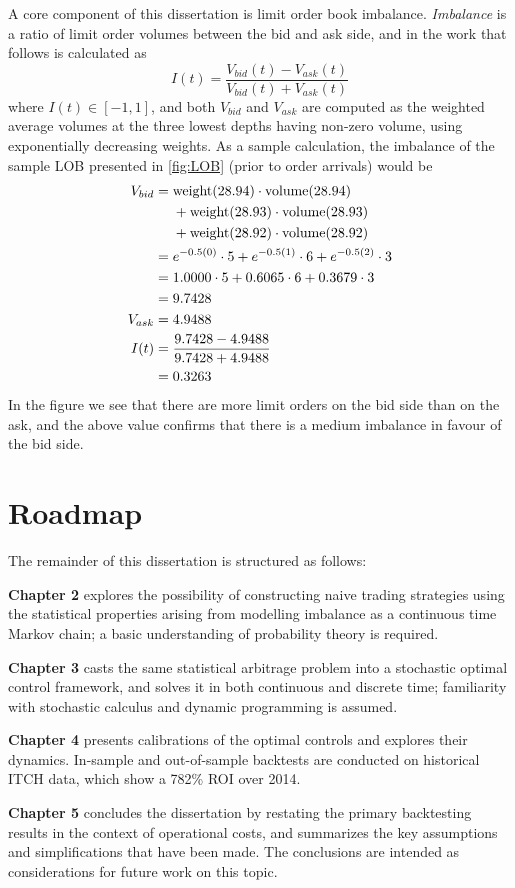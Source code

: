 A core component of this dissertation is limit order book imbalance. \emph{Imbalance} is a ratio of limit order volumes between the bid and ask side, and in the work that follows is calculated as 
\begin{equation}\label{eq:LOBImbalance}
I(t) = \dfrac{V_{bid}(t) - V_{ask}(t)}{V_{bid}(t) + V_{ask}(t)}
\end{equation}
where $I(t) \in [-1,1]$, and both $V_{bid}$ and $V_{ask}$ are computed as the weighted average volumes at the three lowest depths having non-zero volume, using exponentially decreasing weights. As a sample calculation, the imbalance of the sample LOB presented in \autoref{fig:LOB} (prior to order arrivals) would be
\begin{align*}
V_{bid} & = \text{weight}(28.94)\cdot\text{volume}(28.94) \\
& \hphantom{{}={}} + \text{weight}(28.93)\cdot\text{volume}(28.93) \\
& \hphantom{{}={}} + \text{weight}(28.92)\cdot\text{volume}(28.92) \\
& = e^{-0.5 (0)} \cdot 5 + e^{-0.5 (1)} \cdot 6 + e^{-0.5 (2)} \cdot 3\\
& = 1.0000 \cdot 5 + 0.6065 \cdot 6 + 0.3679 \cdot 3 \\
& = 9.7428 \\
V_{ask} & = 4.9488 \\
I(t) & = \dfrac{9.7428 - 4.9488}{9.7428 + 4.9488} \\
&  = 0.3263
\end{align*}
In the figure we see that there are more limit orders on the bid side than on the ask, and the above value confirms that there is a medium imbalance in favour of the bid side.

\section{Roadmap}
The remainder of this dissertation is structured as follows:

{\bf Chapter 2} explores the possibility of constructing naive trading strategies using the statistical properties arising from modelling imbalance as a continuous time Markov chain; a basic understanding of probability theory is required. 

{\bf Chapter 3} casts the same statistical arbitrage problem into a stochastic optimal control framework, and solves it in both continuous and discrete time; familiarity with stochastic calculus and dynamic programming is assumed. 

{\bf Chapter 4} presents calibrations of the optimal controls and explores their dynamics. In-sample and out-of-sample backtests are conducted on historical ITCH data, which show a 782\% ROI over 2014.

{\bf Chapter 5} concludes the dissertation by restating the primary backtesting results in the context of operational costs, and summarizes the key assumptions and simplifications that have been made. The conclusions are intended as considerations for future work on this topic.